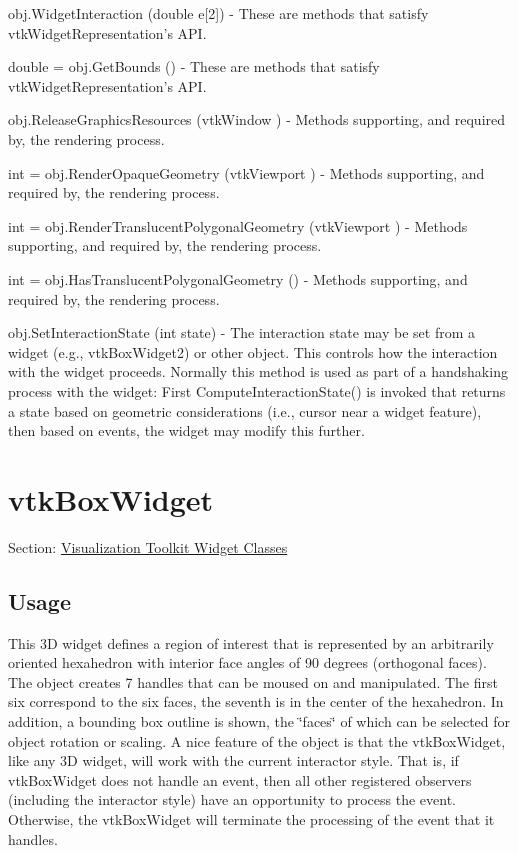 \begin{DoxyItemize}
\item {\ttfamily obj.\-Widget\-Interaction (double e\mbox{[}2\mbox{]})} -\/ These are methods that satisfy vtk\-Widget\-Representation's A\-P\-I.  
\item {\ttfamily double = obj.\-Get\-Bounds ()} -\/ These are methods that satisfy vtk\-Widget\-Representation's A\-P\-I.  
\item {\ttfamily obj.\-Release\-Graphics\-Resources (vtk\-Window )} -\/ Methods supporting, and required by, the rendering process.  
\item {\ttfamily int = obj.\-Render\-Opaque\-Geometry (vtk\-Viewport )} -\/ Methods supporting, and required by, the rendering process.  
\item {\ttfamily int = obj.\-Render\-Translucent\-Polygonal\-Geometry (vtk\-Viewport )} -\/ Methods supporting, and required by, the rendering process.  
\item {\ttfamily int = obj.\-Has\-Translucent\-Polygonal\-Geometry ()} -\/ Methods supporting, and required by, the rendering process.  
\item {\ttfamily obj.\-Set\-Interaction\-State (int state)} -\/ The interaction state may be set from a widget (e.\-g., vtk\-Box\-Widget2) or other object. This controls how the interaction with the widget proceeds. Normally this method is used as part of a handshaking process with the widget\-: First Compute\-Interaction\-State() is invoked that returns a state based on geometric considerations (i.\-e., cursor near a widget feature), then based on events, the widget may modify this further.  
\end{DoxyItemize}\hypertarget{vtkwidgets_vtkboxwidget}{}\section{vtk\-Box\-Widget}\label{vtkwidgets_vtkboxwidget}
Section\-: \hyperlink{sec_vtkwidgets}{Visualization Toolkit Widget Classes} \hypertarget{vtkwidgets_vtkxyplotwidget_Usage}{}\subsection{Usage}\label{vtkwidgets_vtkxyplotwidget_Usage}
This 3\-D widget defines a region of interest that is represented by an arbitrarily oriented hexahedron with interior face angles of 90 degrees (orthogonal faces). The object creates 7 handles that can be moused on and manipulated. The first six correspond to the six faces, the seventh is in the center of the hexahedron. In addition, a bounding box outline is shown, the \char`\"{}faces\char`\"{} of which can be selected for object rotation or scaling. A nice feature of the object is that the vtk\-Box\-Widget, like any 3\-D widget, will work with the current interactor style. That is, if vtk\-Box\-Widget does not handle an event, then all other registered observers (including the interactor style) have an opportunity to process the event. Otherwise, the vtk\-Box\-Widget will terminate the processing of the event that it handles.

